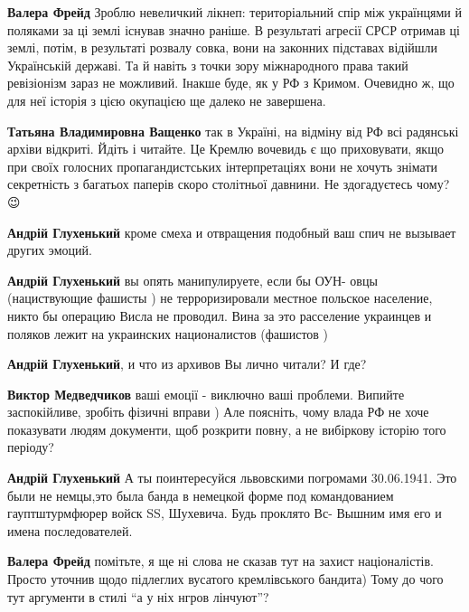 \begin{itemize}
\begin{itemize}
\textbf{Валера Фрейд} Зроблю невеличкий лікнеп: територіальний спір між
українцями й поляками за ці землі існував значно раніше. В результаті агресії
СРСР отримав ці землі, потім, в результаті розвалу совка, вони на законних
підставах відійшли Українській державі. Та й навіть з точки зору міжнародного
права такий ревізіонізм зараз не можливий. Інакше буде, як у РФ з Кримом.
Очевидно ж, що для неї історія з цією окупацією ще далеко не завершена.


\textbf{Татьяна Владимировна Ващенко} так в Україні, на відміну від РФ всі радянські
архіви відкриті. Йдіть і читайте. Це Кремлю вочевидь є що приховувати, якщо при
своїх голосних пропагандистських інтерпретаціях вони не хочуть знімати
секретність з багатьох паперів скоро столітньої давнини. Не здогадуєтесь чому?
😉


\textbf{Андрій Глухенький} кроме смеха и отвращения подобный ваш спич не вызывает других эмоций.


\textbf{Андрій Глухенький} вы опять манипулируете, если бы ОУН- овцы
(нациствующие фашисты ) не терроризировали местное польское население, никто бы
операцию Висла не проводил. Вина за это расселение украинцев и поляков лежит на
украинских националистов (фашистов )

\textbf{Андрій Глухенький}, и что из архивов Вы лично читали? И где?


\textbf{Виктор Медведчиков} ваші емоції - виключно ваші проблеми. Випийте
заспокійливе, зробіть фізичні вправи ) Але поясніть, чому влада РФ не хоче
показувати людям документи, щоб розкрити повну, а не вибіркову історію того
періоду?

\textbf{Андрій Глухенький} А ты поинтересуйся львовскими погромами 30.06.1941.
Это были не немцы,это была банда в немецкой форме под командованием
гауптштурмфюрер войск SS, Шухевича. Будь проклято Вс- Вышним имя его и имена
последователей.


\textbf{Валера Фрейд} помітьте, я ще ні слова не сказав тут на захист націоналістів.
Просто уточнив щодо підлеглих вусатого кремлівського бандита) Тому до чого тут
аргументи в стилі \enquote{а у ніх нгров лінчуют}?


\end{itemize}
\end{itemize}
